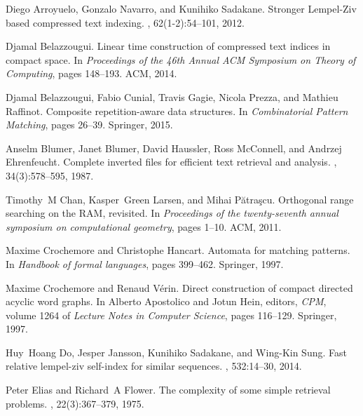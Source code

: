 \documentclass[a4paper,UKenglish]{lipics-v2016}
\begin{document}
\begin{thebibliography}{10}

Diego Arroyuelo, Gonzalo Navarro, and Kunihiko Sadakane.
\newblock Stronger {Lempel-Ziv} based compressed text indexing.
, 62(1-2):54--101, 2012.

Djamal Belazzougui.
\newblock Linear time construction of compressed text indices in compact space.
\newblock In {\em Proceedings of the 46th Annual ACM Symposium on Theory of
  Computing}, pages 148--193. ACM, 2014.

Djamal Belazzougui, Fabio Cunial, Travis Gagie, Nicola Prezza, and Mathieu
  Raffinot.
\newblock Composite repetition-aware data structures.
\newblock In {\em Combinatorial Pattern Matching}, pages 26--39. Springer,
  2015.

Anselm Blumer, Janet Blumer, David Haussler, Ross McConnell, and Andrzej
  Ehrenfeucht.
\newblock Complete inverted files for efficient text retrieval and analysis.
, 34(3):578--595, 1987.

Timothy~M Chan, Kasper~Green Larsen, and Mihai P{\u{a}}tra{\c{s}}cu.
\newblock Orthogonal range searching on the {RAM}, revisited.
\newblock In {\em Proceedings of the twenty-seventh annual symposium on
  computational geometry}, pages 1--10. ACM, 2011.

Maxime Crochemore and Christophe Hancart.
\newblock Automata for matching patterns.
\newblock In {\em Handbook of formal languages}, pages 399--462. Springer,
  1997.

Maxime Crochemore and Renaud V\'erin.
\newblock Direct construction of compact directed acyclic word graphs.
\newblock In Alberto Apostolico and Jotun Hein, editors, {\em CPM}, volume 1264
  of {\em Lecture Notes in Computer Science}, pages 116--129. Springer, 1997.

Huy~Hoang Do, Jesper Jansson, Kunihiko Sadakane, and Wing{-}Kin Sung.
\newblock Fast relative lempel-ziv self-index for similar sequences.
, 532:14--30, 2014.

Peter Elias and Richard~A Flower.
\newblock The complexity of some simple retrieval problems.
, 22(3):367--379, 1975.


\end{thebibliography}
\end{document}
